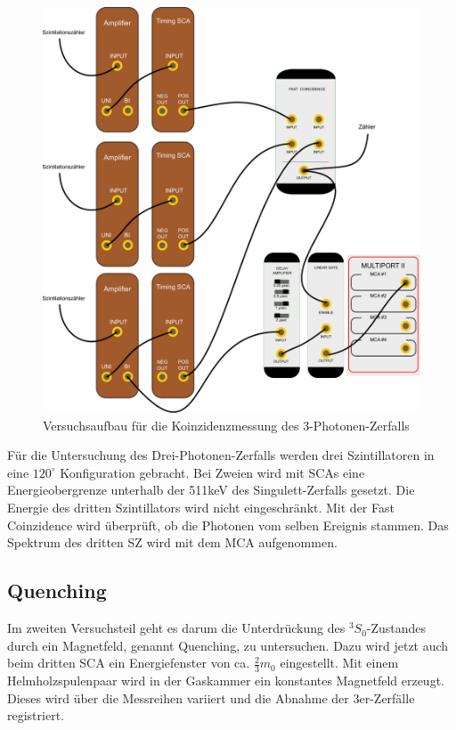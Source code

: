 \begin{figure}[H]
 \includegraphics[width=\textwidth]{BilderAufbau/3er-koinzidenz.pdf}
 \caption{Versuchsaufbau für die Koinzidenzmessung des 3-Photonen-Zerfalls}
 \label{schaltplan_3_sca_coin_mca_zaehler}
\end{figure}

Für die Untersuchung des Drei-Photonen-Zerfalls werden drei Szintillatoren in eine $120^\circ$ Konfiguration gebracht. Bei Zweien wird mit SCAs eine Energieobergrenze unterhalb der 511keV des Singulett-Zerfalls gesetzt. Die Energie des dritten Szintillators wird nicht eingeschränkt. Mit der Fast Coinzidence wird überprüft, ob die Photonen vom selben Ereignis stammen. Das Spektrum des dritten SZ wird mit dem MCA aufgenommen. 

\subsection{Quenching}

Im zweiten Versuchsteil geht es darum die Unterdrückung des ${}^3S_0$-Zustandes durch ein Magnetfeld, genannt Quenching, zu untersuchen. Dazu wird jetzt auch beim dritten SCA ein Energiefenster von ca. $\frac{2}{3} m_0$ eingestellt. Mit einem Helmholzspulenpaar wird in der Gaskammer ein konstantes Magnetfeld erzeugt. Dieses wird über die Messreihen variiert und die Abnahme der 3er-Zerfälle registriert.